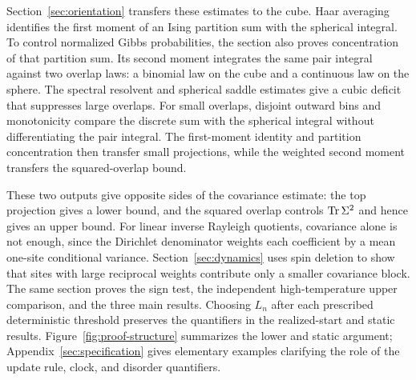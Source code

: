 Section~\ref{sec:orientation} transfers these estimates to the cube.
Haar averaging identifies the first moment of an Ising partition sum with
the spherical integral. To control normalized Gibbs probabilities, the
section also proves concentration of that partition sum. Its second
moment integrates the same pair integral against two overlap laws: a
binomial law on the cube and a continuous law on the sphere. The spectral
resolvent and spherical saddle estimates give a cubic deficit that
suppresses large overlaps. For small overlaps, disjoint outward bins and
monotonicity compare the discrete sum with the spherical integral without
differentiating the pair integral. The first-moment identity and
partition concentration then transfer small projections, while the
weighted second moment transfers the squared-overlap bound.

These two outputs give opposite sides of the covariance estimate: the
top projection gives a lower bound, and the squared overlap controls
$\operatorname{Tr}\Sigma^2$ and hence gives an upper bound. For linear
inverse Rayleigh quotients, covariance alone is not enough, since the
Dirichlet denominator weights each coefficient by a mean one-site conditional
variance. Section~\ref{sec:dynamics} uses spin deletion to show that sites
with large reciprocal weights contribute only a smaller covariance block.
The same section proves the sign test, the independent high-temperature
upper comparison, and the three main results. Choosing $L_n$ after each
prescribed deterministic threshold preserves the quantifiers in the
realized-start and static results.
Figure~\ref{fig:proof-structure} summarizes the lower and static argument;
Appendix~\ref{sec:specification} gives elementary examples clarifying the
role of the update rule, clock, and disorder quantifiers.


